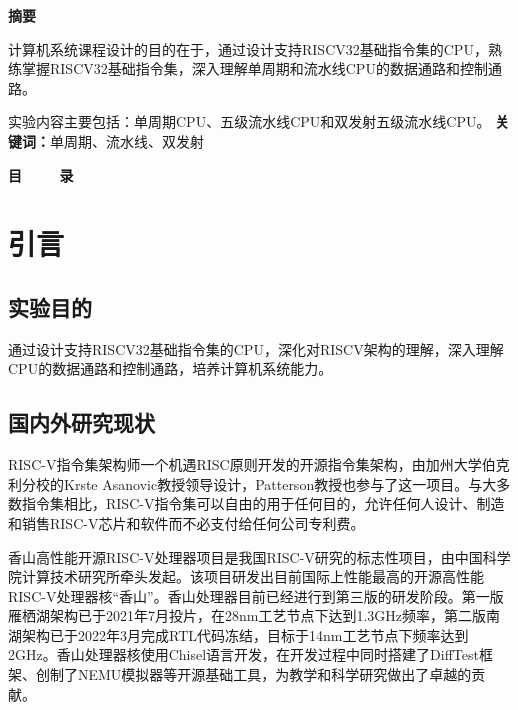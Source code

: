 \documentclass{article}
\begin{document}
    \newpage{}
    \LARGE{}
    \begin{center}
        \bf
        \Large{}
        摘要
    \end{center}
    \vspace{10pt}
    \normalsize{}
    \par{}
        计算机系统课程设计的目的在于，通过设计支持RISCV32基础指令集的CPU，熟练掌握RISCV32基础指令集，深入理解单周期和流水线CPU的数据通路和控制通路。
    \par{}
        实验内容主要包括：单周期CPU、五级流水线CPU和双发射五级流水线CPU。
    \vspace{10pt}
    \newline{}
    {\bf 关键词：}单周期、流水线、双发射

    \newpage{}

    \begin{center}
    {\bf 目 \ \ \ \ 录}
    \end{center}

    {
        \renewcommand{\contentsname}{}
        \tableofcontents
    }
    \newpage{}
    \section{引言}
        \subsection{实验目的}
        \par{}
        通过设计支持RISCV32基础指令集的CPU，深化对RISCV架构的理解，深入理解CPU的数据通路和控制通路，培养计算机系统能力。
        \subsection{国内外研究现状}
        \par{}
        RISC-V指令集架构师一个机遇RISC原则开发的开源指令集架构，由加州大学伯克利分校的Krste Asanovic教授领导设计，Patterson教授也参与了这一项目。与大多数指令集相比，RISC-V指令集可以自由的用于任何目的，允许任何人设计、制造和销售RISC-V芯片和软件而不必支付给任何公司专利费。\cite{ref2}
        \par{}
        香山高性能开源RISC-V处理器项目是我国RISC-V研究的标志性项目，由中国科学院计算技术研究所牵头发起。该项目研发出目前国际上性能最高的开源高性能RISC-V处理器核“香山”。香山处理器目前已经进行到第三版的研发阶段。第一版雁栖湖架构已于2021年7月投片，在28nm工艺节点下达到1.3GHz频率，第二版南湖架构已于2022年3月完成RTL代码冻结，目标于14nm工艺节点下频率达到2GHz。香山处理器核使用Chisel语言开发，在开发过程中同时搭建了DiffTest框架、创制了NEMU模拟器等开源基础工具，为教学和科学研究做出了卓越的贡献。\cite{ref3}
    \newpage{}
\end{document}
